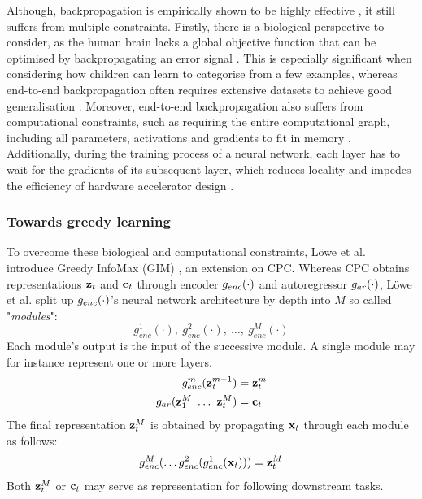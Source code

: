 	Although, backpropagation is empirically shown to be highly effective \cite{NIPS2012_c399862d, ioffeBatchNormalizationAccelerating2015}, it still suffers from multiple constraints. Firstly, there is a biological perspective to consider, as the human brain lacks a global objective function that can be optimised by backpropagating an error signal \cite{marblestoneIntegrationDeepLearning2016}. This is especially significant when considering how children can learn to categorise from a few examples, whereas end-to-end backpropagation often requires extensive datasets to achieve good generalisation \cite{lowePuttingEndEndtoEnd2020}. Moreover, end-to-end backpropagation also suffers from computational constraints, such as requiring the entire computational graph, including all parameters, activations and gradients to fit in memory \cite{lowePuttingEndEndtoEnd2020}. Additionally, during the training process of a neural network, each layer has to wait for the gradients of its subsequent layer, which reduces locality and impedes the efficiency of hardware accelerator design \cite{lowePuttingEndEndtoEnd2020}.
		
	
\subsubsection{Towards greedy learning}	
		To overcome these biological and computational constraints, Löwe et al. introduce Greedy InfoMax (GIM) \cite{lowePuttingEndEndtoEnd2020}, an extension on CPC. Whereas CPC obtains representations $\mathbf{z}_t$ and $\mathbf{c}_t$ through encoder $g_{enc}(\cdot)$ and autoregressor $g_{ar}(\cdot)$, Löwe et al. split up $g_{enc}(\cdot)$'s neural network architecture by depth into $M$ so called "\textit{modules}": 
		$$g_{enc}^1(\cdot),~ g_{enc}^2(\cdot),~\dots,~g_{enc}^M(\cdot)$$ 
		Each module's output is the input of the successive module. A single module may for instance represent one or more layers.
		\begin{align*} %
			g_{enc}^m(\zt^{m-1}) &= \zt^m \\
			g_{ar}(\z_1^M ~ \dots ~ \zt^M) &= \ct
		\end{align*}
		The final representation $\mathbf{z}_t^M$ is obtained by propagating $\mathbf{x}_t$ through each module as follows:
		$$ g_{enc}^M ( \dots	g_{enc}^2(g_{enc}^1(\mathbf{x}_t))) = \mathbf{z}_t^M $$
		Both $\mathbf{z}_t^M$ or $\mathbf{c}_t$ may serve as representation for following downstream tasks.
	


